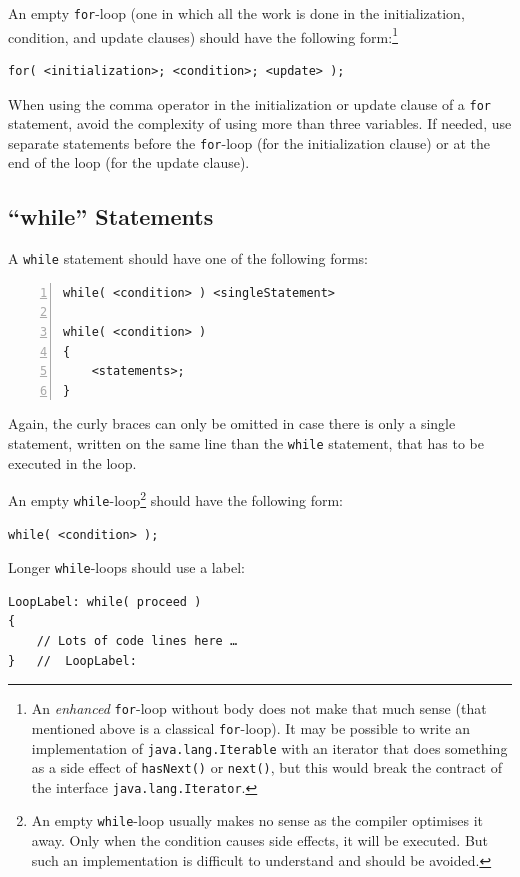 \documentclass[11pt,a4paper, titlepage, parskip=half, headsepline, footsepline, cleardoublepage=current, headheight=1cm]{scrbook}
\begin{document}
An empty \lstinline|for|-loop (one in which all the work is done in the initialization, condition, and update clauses) should have the following form:\footnote{An \textit{enhanced} \lstinline|for|-loop without body does not make that much sense (that mentioned above is a classical \lstinline|for|-loop). It may be possible to write an implementation of \lstinline|java.lang.Iterable| with an iterator that does something as a side effect of \lstinline|hasNext()| or \lstinline|next()|, but this would break the contract of the interface \lstinline|java.lang.Iterator|.}

\begin{lstlisting}
for( <initialization>; <condition>; <update> );
\end{lstlisting}

When using the comma operator in the initialization or update clause of a \lstinline|for| statement, avoid the complexity of using more than three variables. If needed, use separate statements before the \lstinline|for|-loop (for the initialization clause) or at the end of the loop (for the update clause).

\subsection{“while” Statements}\label{sec:WhileStatements}
A \lstinline|while| statement should have one of the following forms:
\begin{lstlisting}[numbers=left]
while( <condition> ) <singleStatement>

while( <condition> )
{
    <statements>;
}
\end{lstlisting}

Again, the curly braces can only be omitted in case there is only a single statement, written on the same line than the \lstinline|while| statement, that has to be executed in the loop.

An empty \lstinline|while|-loop\footnote{An empty \lstinline|while|-loop usually makes no sense as the compiler optimises it away. Only when the condition causes side effects, it will be executed. But such an implementation is difficult to understand and should be avoided.} should have the following form: 
\begin{lstlisting}
while( <condition> );
\end{lstlisting}

Longer \lstinline|while|-loops should use a label:
\begin{lstlisting}
LoopLabel: while( proceed )
{
    // Lots of code lines here …
}   //  LoopLabel:
\end{lstlisting}
\end{document}
